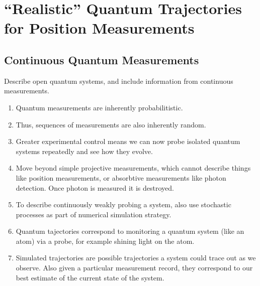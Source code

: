 \chapter{``Realistic'' Quantum Trajectories for Position Measurements}
\label{ch:trajectory}

\section{Continuous Quantum Measurements}

Describe open quantum systems, and include information from continuous measurements. 

\begin{enumerate}
\item Quantum measurements are inherently probabilitistic.  
\item Thus, sequences of measurements are also inherently random.  
\item Greater experimental control means we can now probe isolated quantum systems repeatedly and see how they evolve.  
\item Move beyond simple projective measurements, which cannot describe things like position measurements,
    or absorbtive measurements like photon detection.  Once photon is measured it is destroyed.
\item To describe continuously weakly probing a system, also use stochastic processes as part of
    numerical simulation strategy.
\item Quantum tajectories correspond to monitoring a quantum system (like an atom) via a probe,
 for example shining light on the atom. \cite{Carmichael1993}
\item Simulated trajectories are possible trajectories a system could trace out as we observe.
  Also given a particular measurement record, they correspond to our best estimate of the current state of the system.  
\end{enumerate}

